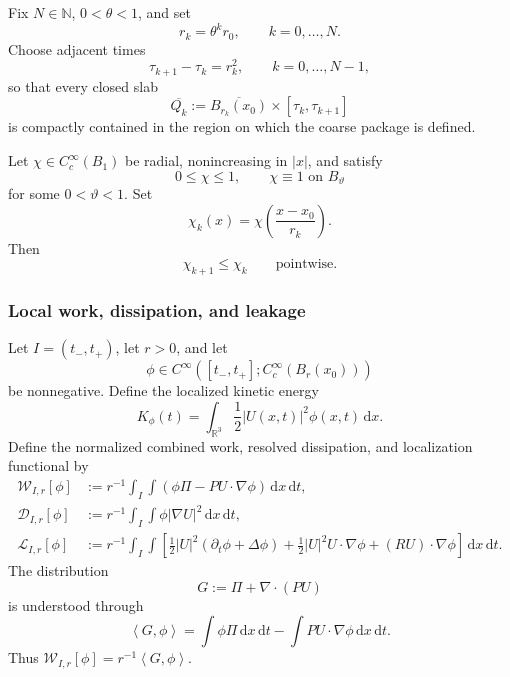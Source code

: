 \documentclass[11pt]{article}
\numberwithin{equation}{section}
\newcommand{\R}{\mathbb R}
\newcommand{\dx}{\,\mathrm dx}
\newcommand{\dxdt}{\,\mathrm dx\,\mathrm dt}
\newcommand{\pair}[2]{\left\langle #1,#2\right\rangle}
\newcommand{\W}{\mathcal W}
\newcommand{\D}{\mathcal D}
\newcommand{\Lk}{\mathcal L}
\begin{document}
Fix \(N\in\mathbb N\), \(0<\theta<1\), and set
\begin{equation}\label{eq:radii}
r_k=\theta^k r_0,
\qquad
k=0,\ldots,N.
\end{equation}
Choose adjacent times
\begin{equation}\label{eq:times}
\tau_{k+1}-\tau_k=r_k^2,
\qquad
k=0,\ldots,N-1,
\end{equation}
so that every closed slab
\[
\overline{Q_k}
:=
\overline{B_{r_k}(x_0)}\times[\tau_k,\tau_{k+1}]
\]
is compactly contained in the region on which the coarse package is defined.

Let \(\chi\in C_c^\infty(B_1)\) be radial, nonincreasing in \(|x|\), and satisfy
\begin{equation}\label{eq:base-cutoff}
0\le \chi\le1,
\qquad
\chi\equiv1\text{ on }B_\vartheta
\end{equation}
for some \(0<\vartheta<1\). Set
\begin{equation}\label{eq:chi-k}
\chi_k(x)=\chi\left(\frac{x-x_0}{r_k}\right).
\end{equation}
Then
\begin{equation}\label{eq:nesting}
\chi_{k+1}\le\chi_k
\qquad\text{pointwise.}
\end{equation}

\subsubsection{Local work, dissipation, and leakage}

Let \(I=(t_-,t_+)\), let \(r>0\), and let
\[
\phi\in C^\infty([t_-,t_+];C_c^\infty(B_r(x_0)))
\]
be nonnegative. Define the localized kinetic energy
\begin{equation}\label{eq:Kphi}
K_\phi(t)=\int_{\R^3}\frac12|U(x,t)|^2\phi(x,t)\dx.
\end{equation}
Define the normalized combined work, resolved dissipation, and localization functional by
\begin{align}
\W_{I,r}[\phi]
&:=
r^{-1}\int_I\int
\left(
\phi\Pi-PU\cdot\nabla\phi
\right)\dxdt,
\label{eq:W-def}
\\
\D_{I,r}[\phi]
&:=
r^{-1}\int_I\int
\phi|\nabla U|^2\dxdt,
\label{eq:D-def}
\\
\Lk_{I,r}[\phi]
&:=
r^{-1}\int_I\int
\left[
\frac12|U|^2(\partial_t\phi+\Delta\phi)
+
\frac12|U|^2U\cdot\nabla\phi
+
(RU)\cdot\nabla\phi
\right]\dxdt.
\label{eq:L-def}
\end{align}
The distribution
\begin{equation}\label{eq:G-def}
G:=\Pi+\nabla\cdot(PU)
\end{equation}
is understood through
\begin{equation}\label{eq:G-pairing}
\pair{G}{\phi}
=
\int\phi\Pi\dxdt-
\int PU\cdot\nabla\phi\dxdt.
\end{equation}
Thus \(\W_{I,r}[\phi]=r^{-1}\pair{G}{\phi}\).
\end{document}
